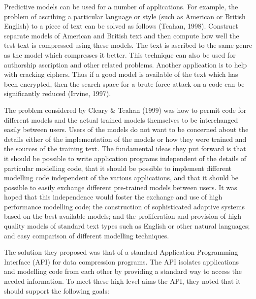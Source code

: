\documentclass[11pt]{article}
\begin{document}
Predictive models can be used for a number of applications.
For example, the problem of ascribing a particular language or
style (such as American or British English) to a piece of text can be solved
as follows (Teahan, 1998). Construct separate models of American and British
text and then compute how well the test text is compressed using these
models. The text is ascribed to the same genre as the model which compresses
it better. This technique can also be used for authorship ascription and
other related problems. Another application is to help with cracking
ciphers. Thus if a good model is available of the text which has been
encrypted, then the search space for a brute force attack on a code can be
significantly reduced (Irvine, 1997).

The problem considered by Cleary \& Teahan (1999) was how to permit
code for different models and the actual trained models themselves to be
interchanged easily between users.
Users of the models do not want to be concerned about the details either of
the implementation of the models or how they were trained and the sources of
the training text. 
The fundamental ideas they put forward is that it should be
possible to write application programs independent of the details of
particular modelling code, that it should be possible to implement different
modelling code independent of the various applications, and that it should be
possible to easily exchange different pre-trained models between users. It
was hoped that this independence would foster the exchange and use of high
performance modelling code; the construction of sophisticated adaptive
systems based on the best available models; and the proliferation and
provision of high quality models of standard text types such as English or
other natural languages; and easy comparison of different modelling
techniques.

The solution they proposed was that of a standard Application Programming
Interface (API) for data compression programs. The API isolates applications
and modelling code from each other by providing a standard way to access the
needed information. To meet these high level aims the API,
they noted that it should support the following goals:
\end{document}
